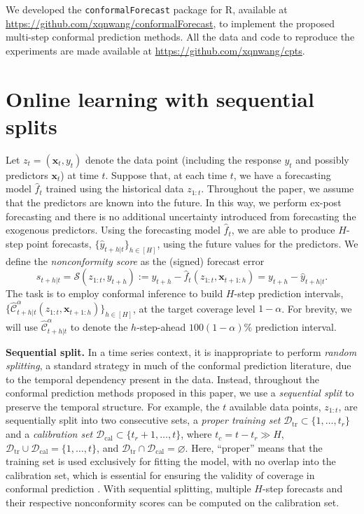 \documentclass[
  11pt,
  a4paper,
]{article}
\theoremstyle{plain}
\theoremstyle{remark}
\begin{document}
We developed the \texttt{conformalForecast} package for R, available at
\url{https://github.com/xqnwang/conformalForecast}, to implement the
proposed multi-step conformal prediction methods. All the data and code
to reproduce the experiments are made available at
\url{https://github.com/xqnwang/cpts}.

\section{Online learning with sequential splits}\label{sec-setup}

Let \(z_t = (\bm{x}_t, y_t)\) denote the data point (including the
response \(y_t\) and possibly predictors \(\bm{x}_t\)) at time \(t\).
Suppose that, at each time \(t\), we have a forecasting model
\(\hat{f}_t\) trained using the historical data \(z_{1:t}\). Throughout
the paper, we assume that the predictors are known into the future. In
this way, we perform ex-post forecasting and there is no additional
uncertainty introduced from forecasting the exogenous predictors. Using
the forecasting model \(\hat{f}_t\), we are able to produce \(H\)-step
point forecasts, \(\{\hat{y}_{t+h|t}\}_{h\in[H]}\), using the future
values for the predictors. We define the \emph{nonconformity score} as
the (signed) forecast error \[
s_{t+h|t}=\mathcal{S}(z_{1:t}, y_{t+h}):=y_{t+h}-\hat{f}_t(z_{1:t},\bm{x}_{t+1:h})=y_{t+h}-\hat{y}_{t+h|t}.
\] The task is to employ conformal inference to build \(H\)-step
prediction intervals,
\(\{\hat{\mathcal{C}}_{t+h|t}^{\alpha}(z_{1:t},\bm{x}_{t+1:h})\}_{h\in[H]}\),
at the target coverage level \(1-\alpha\). For brevity, we will use
\(\hat{\mathcal{C}}_{t+h|t}^{\alpha}\) to denote the \(h\)-step-ahead
\(100(1-\alpha)\%\) prediction interval.

\textbf{Sequential split.} In a time series context, it is inappropriate
to perform \emph{random splitting}, a standard strategy in much of the
conformal prediction literature, due to the temporal dependency present
in the data. Instead, throughout the conformal prediction methods
proposed in this paper, we use a \emph{sequential split} to preserve the
temporal structure. For example, the \(t\) available data points,
\(z_{1:t}\), are sequentially split into two consecutive sets, a
\emph{proper training set}
\(\mathcal{D}_{\text{tr}} \subset \{1,\ldots,t_r\}\) and a
\emph{calibration set}
\(\mathcal{D}_{\text{cal}} \subset \{t_r+1,\ldots,t\}\), where
\(t_c=t-t_r \gg H\),
\(\mathcal{D}_{\text{tr}} \cup \mathcal{D}_{\text{cal}} = \{1, \ldots, t\}\),
and
\(\mathcal{D}_{\text{tr}} \cap \mathcal{D}_{\text{cal}} = \varnothing\).
Here, ``proper'' means that the training set is used exclusively for
fitting the model, with no overlap into the calibration set, which is
essential for ensuring the validity of coverage in conformal prediction
\autocite{papadopoulos2007}. With sequential splitting, multiple
\(H\)-step forecasts and their respective nonconformity scores can be
computed on the calibration set.
\end{document}
